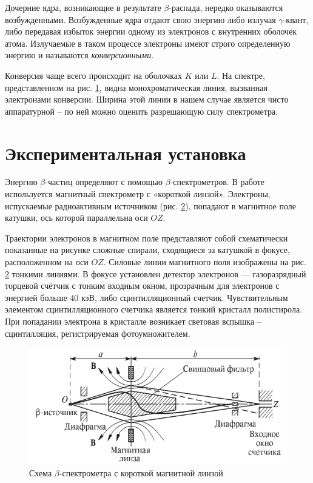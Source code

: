 \documentclass[a4paper,12pt]{article}
\begin{document}
Дочерние ядра, возникающие в результате $\beta$-распада, нередко оказываются возбужденными. Возбужденные ядра отдают свою энергию либо излучая $\gamma$-квант, либо передавая избыток энергии одному из электронов с внутренних оболочек атома. Излучаемые в таком процессе электроны имеют строго определенную энергию и называются \textit{конверсионными}.

Конверсия чаще всего происходит на оболочках $K$ или $L$. На спектре, представленном на рис. \hyperref[fig: Beta-decay spectrum]{1}, видна монохроматическая линия, вызванная электронами конверсии. Ширина этой линии в нашем случае является чисто аппаратурной -- по ней можно оценить разрешающую силу спектрометра.

\section{Экспериментальная установка}
Энергию $\beta$-частиц определяют с помощью $\beta$-спектрометров. В работе используется магнитный спектрометр с «короткой линзой». Электроны, испускаемые радиоактивным источником (рис. \hyperref[fig: Beta decay scheme]{2}), попадают в магнитное поле катушки, ось которой параллельна оси $OZ$.

Траектории электронов в магнитном поле представляют собой схематически показанные на рисунке сложные спирали, сходящиеся за катушкой в фокусе, расположенном на оси $OZ$. Силовые линии магнитного поля изображены на рис. \hyperref[fig: Beta decay scheme]{2} тонкими линиями. В фокусе установлен детектор электронов — газоразрядный торцевой счётчик с тонким входным окном, прозрачным для электронов с энергией больше $40$ кэВ, либо сцинтилляционный счетчик. Чувствительным элементом сцинтилляционного счетчика является тонкий кристалл полистирола. При попадании электрона в кристалле возникает световая вспышка -- сцинтилляция, регистрируемая фотоумножителем.
\begin{figure}[H]\label{fig: Beta decay scheme}
    \centering
    \includegraphics[width = \textwidth]{Beta decay scheme.png}
    \caption{Схема $\beta$-спектрометра с короткой магнитной линзой}
\end{figure}
\end{document}
